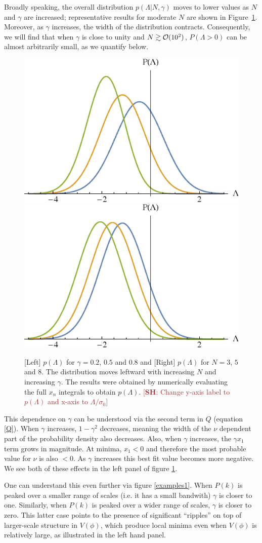 \documentclass[12pt]{article}
\newcommand{\SH}[1]{\textcolor{brown}{[{\bf SH}: #1]}}
\begin{document}
Broadly speaking, the overall distribution $p(\Lambda | N,\gamma)$ moves to lower values as $N$ and $\gamma$ are increased;  representative results for moderate $N$ are shown in Figure~\ref{distributions}. Moreover, as $\gamma$ increases, the width of the distribution contracts. Consequently, we will find that when $\gamma$ is close to unity and $N \gtrsim {\cal{O}}(10^2)$, $P(\Lambda >0)$ can be almost arbitrarily small, as we quantify below. 


\begin{figure}
  \centering
  \includegraphics[width=0.45 \linewidth]{PLam_gamma.eps}  \hfill
  \includegraphics[width=0.45 \linewidth]{PLam_N.eps}
  \caption{[Left] $p(\Lambda)$ for $\gamma = 0.2$, $0.5$ and $0.8$ and [Right] $p(\Lambda)$ for $N=3$, $5$ and $8$. The distribution moves leftward with increasing $N$ and increasing $\gamma$. The results were obtained by numerically evaluating the full $x_n$ integrals to obtain $p(\Lambda)$. \SH{Change y-axis label to $p(\Lambda)$ and x-axis to $\Lambda/\sigma_0$}}
  \label{distributions}
  \end{figure}

This dependence on $\gamma$ can be understood via the second term in $Q$ (equation \eqref{Q}). When $\gamma$ increases, $1-\gamma^2$ decreases, meaning the width of the $\nu$ dependent part of the probability density also decreases. Also, when $\gamma$ increases, the $\gamma x_1$ term grows in magnitude. At minima, $x_1 <0$ and therefore the most probable value for $\nu$ is also $<0$. As $\gamma$ increases this best fit value becomes more negative. We see both of these effects in the left panel of figure \ref{distributions}.

One can understand this even further via figure \ref{examples1}. When $P(k)$ is peaked over a smaller range of scales (i.e. it has a small bandwith) $\gamma$ is closer to one. Similarly, when $P(k)$ is peaked over a wider range of scales, $\gamma$ is closer to zero. This latter case points to the presence of significant ``ripples'' on top of larger-scale structure in $V(\phi)$, which produce local minima even when $V(\phi)$ is relatively large, as illustrated in the left hand panel.
\end{document}
